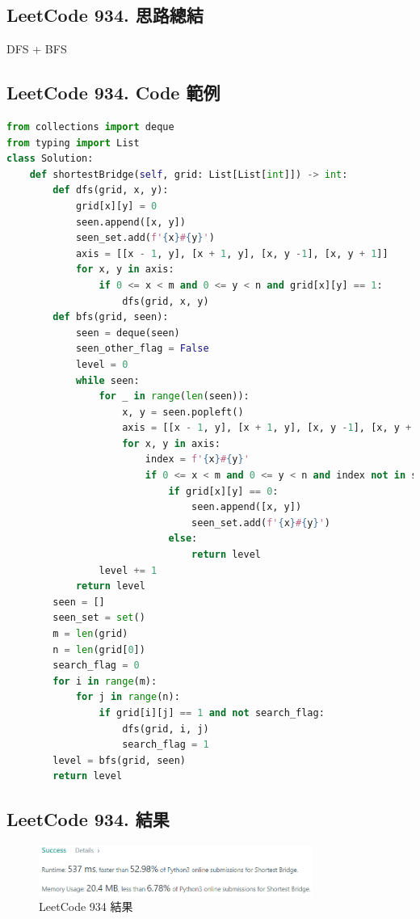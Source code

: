 \documentclass[10pt,UTF8]{ctexart}
\begin{document}
\subsection{LeetCode 934. 思路總結}

DFS + BFS

\subsection{LeetCode 934. Code 範例}

\begin{lstlisting}[language={python}]
from collections import deque
from typing import List
class Solution:
    def shortestBridge(self, grid: List[List[int]]) -> int:
        def dfs(grid, x, y):
            grid[x][y] = 0
            seen.append([x, y])
            seen_set.add(f'{x}#{y}')
            axis = [[x - 1, y], [x + 1, y], [x, y -1], [x, y + 1]]
            for x, y in axis:
                if 0 <= x < m and 0 <= y < n and grid[x][y] == 1:
                    dfs(grid, x, y)
        def bfs(grid, seen):
            seen = deque(seen)
            seen_other_flag = False
            level = 0
            while seen:
                for _ in range(len(seen)):
                    x, y = seen.popleft()
                    axis = [[x - 1, y], [x + 1, y], [x, y -1], [x, y + 1]]
                    for x, y in axis:
                        index = f'{x}#{y}'
                        if 0 <= x < m and 0 <= y < n and index not in seen_set:
                            if grid[x][y] == 0:
                                seen.append([x, y])
                                seen_set.add(f'{x}#{y}')
                            else:
                                return level
                level += 1
            return level
        seen = []
        seen_set = set()
        m = len(grid)
        n = len(grid[0])
        search_flag = 0
        for i in range(m):
            for j in range(n):
                if grid[i][j] == 1 and not search_flag:
                    dfs(grid, i, j)
                    search_flag = 1
        level = bfs(grid, seen)
        return level
\end{lstlisting}

\subsection{LeetCode 934. 結果}

\begin{figure}[H]
\centering 
\includegraphics[width=0.80\textwidth]{lc-934-o.png} 
\caption{LeetCode 934 結果}
\label{Test}
\end{figure}
\end{document}
